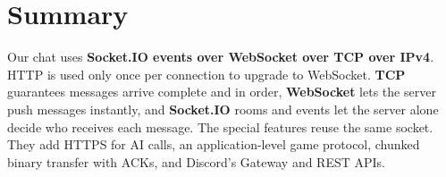 \documentclass[11pt,a4paper]{article}
\begin{document}
\section{Summary}

Our chat uses \textbf{Socket.IO events over WebSocket over TCP over IPv4}. HTTP
is used only once per connection to upgrade to WebSocket. \textbf{TCP}
guarantees messages arrive complete and in order, \textbf{WebSocket} lets the
server push messages instantly, and \textbf{Socket.IO} rooms and events let the
server alone decide who receives each message. The special features reuse the
same socket. They add HTTPS for AI calls, an application-level game protocol,
chunked binary transfer with ACKs, and Discord's Gateway and REST APIs.
\end{document}
